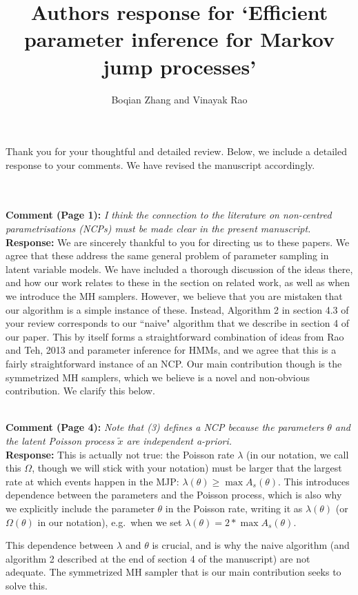 \documentclass[11pt]{article}
\title{Authors response for `Efficient parameter inference for Markov jump processes'}
\author{Boqian Zhang and Vinayak Rao }
\date{}
\newcommand{\rev}[2]{\textbf{Comment #1: }\emph{#2}}
\newcommand{\resp}{\textbf{Response: }}
\begin{document}
\maketitle

Thank you for your thoughtful and detailed review. Below, we include a detailed response to your comments. We have revised the manuscript accordingly. 

~\\~\\
\rev{(Page 1)}{I think the connection to the literature on non-centred parametrisations (NCPs) must be made clear in the present manuscript.}\\ 
\resp 
We are sincerely thankful to you for directing us to these papers. We agree that these address the same general problem of parameter sampling in latent variable models. 
We have included a thorough discussion of the ideas there, and how our work relates to these in the section on related work, as well as when we introduce the MH samplers.
However, we believe that you are mistaken that our algorithm is a simple instance of these. 
Instead, Algorithm 2 in section 4.3 of your review corresponds to our ``naive" algorithm that we describe in section 4 of our paper. 
This by itself forms a straightforward combination of ideas from Rao and Teh, 2013 and parameter inference for HMMs, and we agree that this is a fairly straightforward instance of an NCP. 
Our main contribution though is the symmetrized MH samplers, which we believe is a novel and non-obvious contribution. We clarify this below.

~\\
\rev{(Page 4)}{Note that (3) defines a NCP because the parameters $\theta$ and the latent Poisson process $\tilde{x}$ are independent a-priori.}\\
\resp{This is actually not true: the Poisson rate $\lambda$ (in our notation, we call this $\Omega$, though we will stick with your notation) must be larger that the largest rate at which events happen in the MJP: 
  $\lambda(\theta) \ge \max A_s(\theta)$. 
  This introduces dependence between the parameters and the Poisson process, which is also why we explicitly include the parameter $\theta$ in the Poisson rate, writing it as $\lambda(\theta)$ (or $\Omega(\theta)$ in our notation), e.g.\ when we set 
$\lambda(\theta) = 2 * \max A_s(\theta)$.}

This dependence between $\lambda$ and $\theta$ is crucial, and is why the naive algorithm (and algorithm 2 described at the end of section 4 of the manuscript) are not adequate. 
The symmetrized MH sampler that is our main contribution seeks to solve this.
\end{document}
